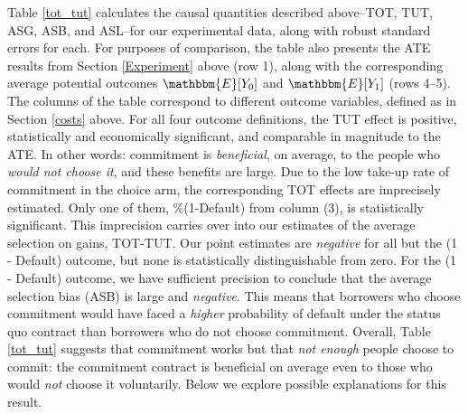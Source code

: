 \documentclass[oneside,11pt]{article}
\begin{document}
Table \ref{tot_tut} calculates the causal quantities described above--TOT, TUT, ASG, ASB, and ASL--for our experimental data, along with robust standard errors for each. 
For purposes of comparison, the table also presents the ATE results from Section \ref{Experiment} above (row 1), along with the corresponding average potential outcomes $\mathbbm{E}[Y_0]$ and $\mathbbm{E}[Y_1]$ (rows 4--5).
The columns of the table correspond to different outcome variables, defined as in Section \ref{costs} above.
For all four outcome definitions, the TUT effect is positive, statistically and economically significant, and comparable in magnitude to the ATE.
In other words: commitment is \emph{beneficial}, on average, to the people who \emph{would not choose it}, and these benefits are large.
Due to the low take-up rate of commitment in the choice arm, the corresponding TOT effects are imprecisely estimated. Only one of them, \%(1-Default) from column (3), is statistically significant. 
This imprecision carries over into our estimates of the average selection on gains, TOT-TUT. Our point estimates are \emph{negative} for all but the (1 - Default) outcome, but none is statistically distinguishable from zero. 
For the (1 - Default) outcome, we have sufficient precision to conclude that the average selection bias (ASB) is large and \emph{negative}.
This means that borrowers who choose commitment would have faced a \emph{higher} probability of default under the status quo contract than borrowers who do not choose commitment. 
Overall, Table \ref{tot_tut} suggests that commitment works but that \emph{not enough} people choose to commit: the commitment contract is beneficial on average even to those who would \emph{not} choose it voluntarily. Below we explore possible explanations for this result.
\end{document}
